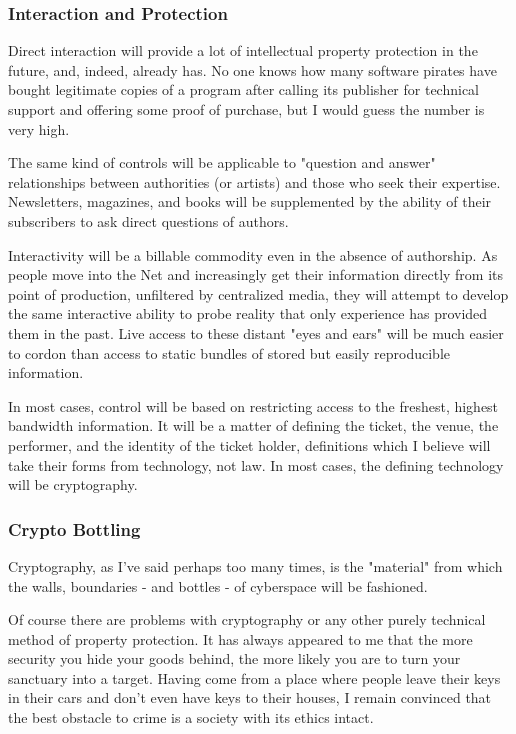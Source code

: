 \documentclass[
]{article}
\begin{document}
\hypertarget{header-n373}{%
\subsubsection{Interaction and Protection}\label{header-n373}}

Direct interaction will provide a lot of intellectual property
protection in the future, and, indeed, already has. No one knows how
many software pirates have bought legitimate copies of a program after
calling its publisher for technical support and offering some proof of
purchase, but I would guess the number is very high.

The same kind of controls will be applicable to "question and answer"
relationships between authorities (or artists) and those who seek their
expertise. Newsletters, magazines, and books will be supplemented by the
ability of their subscribers to ask direct questions of authors.

Interactivity will be a billable commodity even in the absence of
authorship. As people move into the Net and increasingly get their
information directly from its point of production, unfiltered by
centralized media, they will attempt to develop the same interactive
ability to probe reality that only experience has provided them in the
past. Live access to these distant "eyes and ears" will be much easier
to cordon than access to static bundles of stored but easily
reproducible information.

In most cases, control will be based on restricting access to the
freshest, highest bandwidth information. It will be a matter of defining
the ticket, the venue, the performer, and the identity of the ticket
holder, definitions which I believe will take their forms from
technology, not law. In most cases, the defining technology will be
cryptography.

\hypertarget{header-n378}{%
\subsubsection{Crypto Bottling}\label{header-n378}}

Cryptography, as I've said perhaps too many times, is the "material"
from which the walls, boundaries - and bottles - of cyberspace will be
fashioned.

Of course there are problems with cryptography or any other purely
technical method of property protection. It has always appeared to me
that the more security you hide your goods behind, the more likely you
are to turn your sanctuary into a target. Having come from a place where
people leave their keys in their cars and don't even have keys to their
houses, I remain convinced that the best obstacle to crime is a society
with its ethics intact.
\end{document}
